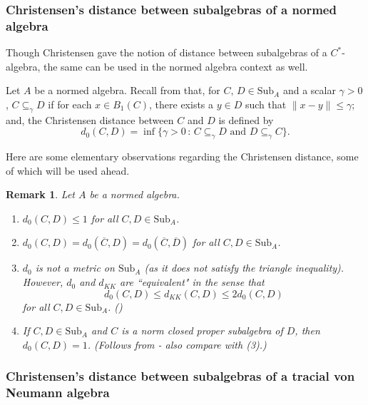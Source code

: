 \documentclass{amsart}
\numberwithin{equation}{section}
\newcommand{\1}{\mathbf{1}}
\newtheorem{remark}[theorem]{Remark}
\begin{document}
 \subsubsection{Christensen's distance between subalgebras of a normed algebra}

 Though Christensen gave the notion of distance between subalgebras of a
 $C^*$-algebra, the same can be used in the normed algebra context as
 well.

 Let $A$ be a normed algebra. Recall from \cite{Ch2} that, for $C,\, D
 \in \mathrm{Sub}_A$ and a scalar $\gamma > 0$, $C \subseteq_{\gamma}
 D$ if for each $x \in B_1(C)$, there exists a $
 y \in D$ such that $\|x-y\| \leq \gamma$; and, the Christensen
 distance between $C$ and $D$ is defined by
    \begin{equation}\label{d0}
    d_0(C,D) = \inf\{\gamma > 0 \, : \, C \subseteq_{\gamma}
    D \text{ and } D \subseteq_{\gamma} C\}.
    \end{equation}

    Here are some elementary observations regarding the Christensen
    distance, some of which will be used ahead.
    \begin{remark}\label{d0-basics}  Let $A$ be a normed algebra.
      \begin{enumerate}
      \item $d_0(C, D) \leq 1$ for all $C, D \in
        \text{Sub}_A$.
\item $d_0(C, D) = d_0(\overline{C}, D)= d_0(\overline{C},
  \overline{D})$ for all $C, D \in \text{Sub}_A$.
  \item $d_0$ is not a metric on
    $\mathrm{Sub}_A$ (as it  does
    not satisfy the triangle inequality). However, $d_0$ and $d_{KK}$
    are ``equivalent" in the sense that
  \[
  d_0 (C, D) \leq d_{KK}(C, D) \leq 2 d_0(C, D)
  \]
  for all $C, D \in \mathrm{Sub}_A$. (\cite[Remark 2.3]{Ch3})
\item If $C, D \in \mathrm{Sub}_A$ and $C$ is a norm closed proper
  subalgebra of $D$, then $d_0 (C , D ) =1$. (Follows from \cite[Proposition
    2.4]{Ch3} - also compare with (3).)
      \end{enumerate}
      \end{remark}

\subsubsection{Christensen's distance between subalgebras of a  tracial von Neumann algebra}\label{dC-section}
\end{document}
